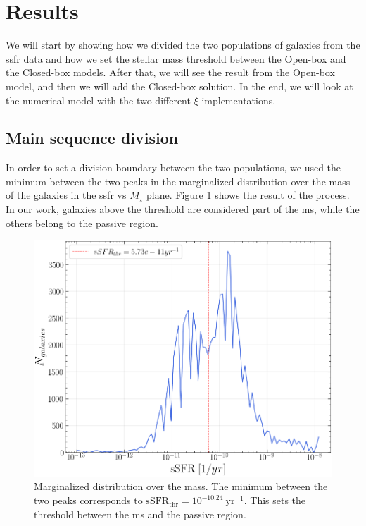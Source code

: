 \documentclass[fleqn, usenatbib]{mnras}
\begin{document}
\section{Results}

We will start by showing how we divided the two populations of galaxies from the \acrshort{ssfr} data and how we set the stellar mass threshold between the Open-box and the Closed-box models. After that, we will see the result from the Open-box model, and then we will add the Closed-box solution. In the end, we will look at the numerical model with the two different \(\xi\) implementations.

\subsection{Main sequence division}

In order to set a division boundary between the two populations, we used the minimum between the two peaks in the marginalized distribution over the mass of the galaxies in the \acrshort{ssfr} vs \(M_{\star}\) plane. Figure \ref{fig:marinalized_dist_mass} shows the result of the process. In our work, galaxies above the threshold are considered part of the \acrlong{ms}, while the others belong to the passive region.
\begin{figure}
	\includegraphics[width=\columnwidth]{images/marginalized_dist_mass.png}
	\caption{Marginalized distribution over the mass. The minimum between the two peaks corresponds to \(\mathrm{sSFR}_{\mathrm{thr}} = 10^{-10.24}\ \mathrm{yr^{-1}}\). This sets the threshold between the \acrlong{ms} and the passive region.}
	\label{fig:marinalized_dist_mass}
\end{figure}
\end{document}
